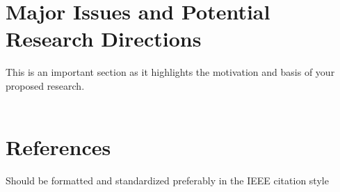 \documentclass[a4paper,12pt]{article}
\begin{document}
	\section{Major Issues and Potential Research Directions}
	\begin{adjustwidth}{3.27em}{0em}
		This is an important section as it highlights the motivation and basis of your proposed research.\\
		~\\
	\end{adjustwidth}
	
	\section{References}
	\vspace{3mm}
	\printbibliography[heading=none]
	\begin{adjustwidth}{3.27em}{0em}
		Should be formatted and standardized preferably in the IEEE citation style
	\end{adjustwidth}
\end{document}
